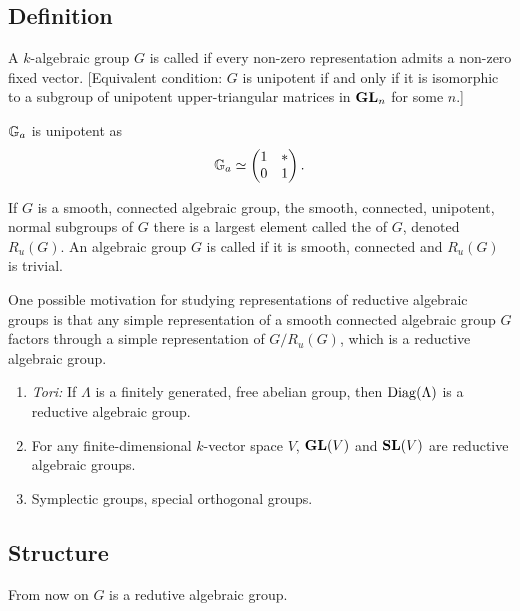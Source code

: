 	\subsection{Definition}
	A $k$-algebraic group $G$ is called  if every non-zero representation
	admits a non-zero fixed vector. [Equivalent condition: $G$ is unipotent if and only if
	it is isomorphic to a subgroup of unipotent upper-triangular matrices in $\mathbf{GL}_n$ for some $n$.]
	\begin{example}
		$\mathbb{G}_a$ is unipotent as
		\[
			\mathbb{G}_a \simeq
			\begin{pmatrix} 1 & * \\ 0 & 1
			\end{pmatrix} .
		\]
	\end{example}
	If $G$ is a smooth, connected algebraic group, the smooth, connected, unipotent, normal
	subgroups of $G$ there is a largest element called the  of $G$,
	denoted $R_u(G)$. An algebraic group $G$ is called  if it is smooth,
	connected and $R_u(G)$ is trivial.

	One possible motivation for studying representations of reductive algebraic groups is
	that any simple representation of a smooth connected algebraic group $G$ factors through
	a simple representation of $G /R_u(G)$, which is a reductive algebraic group.

	\begin{example} \leavevmode
		\begin{enumerate}[(1)]
			\item \emph{Tori:} If $\Lambda$ is a finitely generated, free abelian group, then
				$\operatorname{Diag}(\Lambda)$ is a reductive algebraic group.
			\item For any finite-dimensional $k$-vector space $V$, $\mathbf{GL}(V)$ and $\mathbf{SL}(V)$ are
				reductive algebraic groups.
			\item Symplectic groups, special orthogonal groups.
		\end{enumerate}
	\end{example}
	\subsection{Structure} From now on $G$ is a redutive algebraic group.

